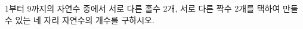 \hspace*{2mm}\begin{minipage}[t]{\dimexpr\linewidth-2mm\relax}\vspace{0pt}
1부터 9까지의 자연수 중에서 서로 다른 홀수 2개, 서로 다른 짝수 2개를 택하여 만들 수 있는 네 자리 자연수의 개수를 구하시오.\end{minipage}
